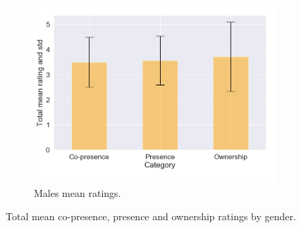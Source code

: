 \begin{figure}[H]
\begin{subfigure}[b]{0.3\textwidth}
 \end{subfigure}
  \hspace{10mm}
\begin{subfigure}[b]{0.3\textwidth}
 \centering
 \includegraphics[scale=0.3]{Files/Plots/misc_all_mean_m.png}
 \caption{Males mean ratings.}
 \label{fig:miscAllMales}
 \end{subfigure}
 \caption{Total mean co-presence, presence and ownership ratings by gender. }
\label{fig:miscAllGendered}
\end{figure}



